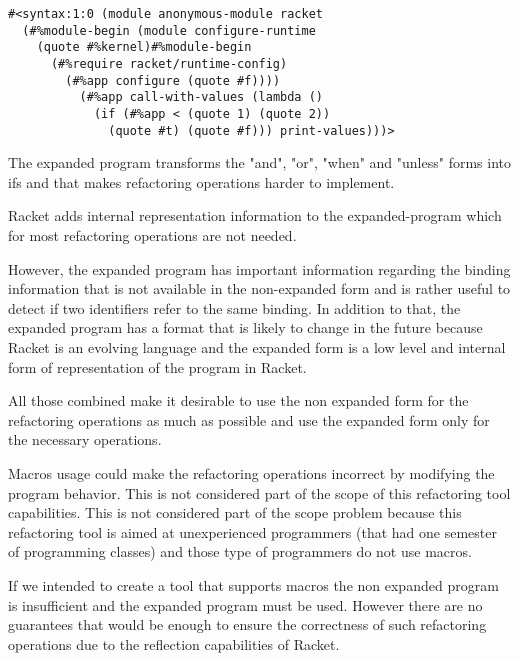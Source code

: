 \begin{lstlisting}[basicstyle=\ttfamily, caption="Expanded Syntax from example"]
#<syntax:1:0 (module anonymous-module racket
  (#%module-begin (module configure-runtime
    (quote #%kernel)#%module-begin
      (#%require racket/runtime-config)
        (#%app configure (quote #f))))
          (#%app call-with-values (lambda ()
            (if (#%app < (quote 1) (quote 2))
              (quote #t) (quote #f))) print-values)))>
\end{lstlisting}



The expanded program transforms the "and", "or", "when" and "unless" forms into
ifs and that makes refactoring operations harder to implement.

Racket adds internal representation information to the expanded-program which for
most refactoring operations are not needed.

However, the expanded program has important information regarding the binding
information that is not available in the non-expanded form and is rather useful
to detect if two identifiers refer to the same binding.
In addition to that, the expanded program has a format that is likely to change
in the future because Racket is an evolving language and the expanded form is a
low level and internal form of representation of the program in Racket.

All those combined make it desirable to use the non expanded form for the refactoring
operations as much as possible and use the expanded form only for the necessary
operations.


Macros usage could make the refactoring operations incorrect by modifying the
program behavior. This is not considered part of the scope of this refactoring
tool capabilities.
This is not considered part of the scope problem because this refactoring tool
is aimed at unexperienced programmers (that had one semester of programming classes)
 and those type of programmers do not use macros.

 If we intended to create a tool that supports macros the non expanded program
 is insufficient and the expanded program must be used. However there are no
 guarantees that would be enough to ensure the correctness of such refactoring
 operations due to the reflection capabilities of Racket.

